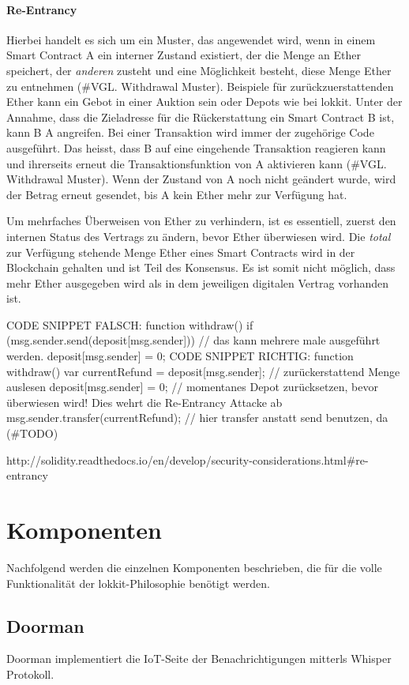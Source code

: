 \paragraph{Re-Entrancy}
Hierbei handelt es sich um ein Muster, das angewendet wird, wenn in einem Smart Contract A ein interner Zustand existiert, der die Menge an Ether speichert, der \emph{anderen} zusteht und eine Möglichkeit besteht, diese Menge Ether zu entnehmen (\#VGL. Withdrawal Muster). Beispiele für zurückzuerstattenden Ether kann ein Gebot in einer Auktion sein oder Depots wie bei lokkit.
Unter der Annahme, dass die Zieladresse für die Rückerstattung ein Smart Contract B ist, kann B A angreifen. Bei einer Transaktion wird immer der zugehörige Code ausgeführt. Das heisst, dass B auf eine eingehende Transaktion reagieren kann und ihrerseits erneut die Transaktionsfunktion von A aktivieren kann (\#VGL. Withdrawal Muster). Wenn der Zustand von A noch nicht geändert wurde, wird der Betrag erneut gesendet, bis A kein Ether mehr zur Verfügung hat.

Um mehrfaches Überweisen von Ether zu verhindern, ist es essentiell, zuerst den internen Status des Vertrags zu ändern, bevor Ether überwiesen wird. Die \emph{total} zur Verfügung stehende Menge Ether eines Smart Contracts wird in der Blockchain gehalten und ist Teil des Konsensus. Es ist somit nicht möglich, dass mehr Ether ausgegeben wird als in dem jeweiligen digitalen Vertrag vorhanden ist. 

CODE SNIPPET FALSCH:
    function withdraw() {
        if (msg.sender.send(deposit[msg.sender])) { // das kann mehrere male ausgeführt werden.
            deposit[msg.sender] = 0;
        }
    }
CODE SNIPPET RICHTIG:
    function withdraw() {
        var currentRefund = deposit[msg.sender]; // zurückerstattend Menge auslesen
        deposit[msg.sender] = 0; // momentanes Depot zurücksetzen, bevor überwiesen wird! Dies wehrt die Re-Entrancy Attacke ab
        msg.sender.transfer(currentRefund); // hier transfer anstatt send benutzen, da (\#TODO)
    }

http://solidity.readthedocs.io/en/develop/security-considerations.html\#re-entrancy

\section{Komponenten}
\label{sec:Komponenten}
Nachfolgend werden die einzelnen Komponenten beschrieben, die für die volle Funktionalität der lokkit-Philosophie benötigt werden.
\subsection{Doorman}
Doorman implementiert die IoT-Seite der Benachrichtigungen mitterls Whisper Protokoll.
